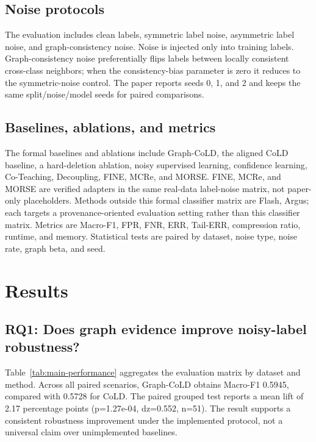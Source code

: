 \documentclass[preprint,review,12pt]{elsarticle}
\begin{document}
\begin{table}[t]
\centering
\caption{Verified real-data protocols. CESNET-TLS-Year22 is an audit-window subset and not a full-archive evaluation.}
\label{tab:dataset-protocol}
\resizebox{\textwidth}{!}{}
\end{table}

\subsection{Noise protocols}
The evaluation includes clean labels, symmetric label noise, asymmetric label
noise, and graph-consistency noise. Noise is injected only into training labels.
Graph-consistency noise preferentially flips labels between locally consistent
cross-class neighbors; when the consistency-bias parameter is zero it reduces to
the symmetric-noise control. The paper reports seeds 0, 1, and 2 and keeps the
same split/noise/model seeds for paired comparisons.

\subsection{Baselines, ablations, and metrics}
The formal baselines and ablations include Graph-CoLD, the aligned CoLD
baseline, a hard-deletion ablation, noisy supervised learning, confidence
learning, Co-Teaching, Decoupling, FINE, MCRe, and MORSE. FINE, MCRe, and MORSE
are verified adapters in the same real-data label-noise matrix, not paper-only
placeholders. Methods outside this formal classifier matrix are
Flash, Argus; each targets a provenance-oriented evaluation setting rather
than this classifier matrix. Metrics are Macro-F1, FPR, FNR, ERR, Tail-ERR,
compression ratio, runtime, and memory. Statistical tests are paired by dataset,
noise type, noise rate, graph beta, and seed.

\section{Results}
\subsection{RQ1: Does graph evidence improve noisy-label robustness?}
Table~\ref{tab:main-performance} aggregates the evaluation matrix by dataset and
method. Across all paired scenarios, Graph-CoLD obtains Macro-F1
0.5945, compared with 0.5728 for
CoLD. The paired grouped test reports a mean lift of
2.17 percentage points (p=1.27e-04,
dz=0.552, n=51). The result supports a
consistent robustness improvement under the implemented protocol, not a universal
claim over unimplemented baselines.
\end{document}
